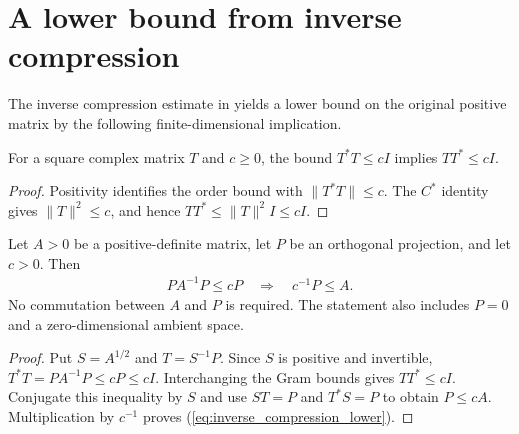 \section{A lower bound from inverse compression}
\label{sec:inverse-compression-lower-bound}

The inverse compression estimate in
\cite[Section~7, lines~585--605]{OpenAI2026AreaLaw} yields a lower bound
on the original positive matrix by the following finite-dimensional implication.

\begin{theorem}
\label{thm:inverse-compression-gram-bound}
\leanok
For a square complex matrix $T$ and $c\ge0$, the bound $T^*T\le cI$
implies $TT^*\le cI$.
\end{theorem}

\begin{proof}
\leanok
Positivity identifies the order bound with $\|T^*T\|\le c$.
The $C^*$ identity gives $\|T\|^2\le c$, and hence
$TT^*\le\|T\|^2I\le cI$.
\end{proof}

\begin{theorem}
\label{thm:inverse-compression-lower-bound}
\leanok
Let $A>0$ be a positive-definite matrix, let $P$ be an orthogonal projection,
and let $c>0$. Then
\begin{align}
 PA^{-1}P\le cP\quad\Longrightarrow\quad c^{-1}P\le A.
 \label{eq:inverse_compression_lower}
\end{align}
No commutation between $A$ and $P$ is required. The statement also includes
$P=0$ and a zero-dimensional ambient space.
\end{theorem}

\begin{proof}
\leanok
Put $S=A^{1/2}$ and $T=S^{-1}P$. Since $S$ is positive and invertible,
$T^*T=PA^{-1}P\le cP\le cI$. Interchanging the Gram bounds gives
$TT^*\le cI$. Conjugate this inequality by $S$ and use $ST=P$ and
$T^*S=P$ to obtain $P\le cA$. Multiplication by $c^{-1}$ proves
(\ref{eq:inverse_compression_lower}).
\end{proof}
